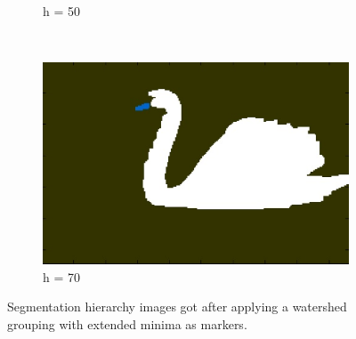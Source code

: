 \documentclass[10pt,twocolumn,letterpaper]{article}
\begin{document}
\begin{figure}
\begin{subfigure}[b]{0.2\textwidth}
        \caption{h = 50}
        \label{fig:h50}
    \end{subfigure}
    ~ 
    \begin{subfigure}[b]{0.2\textwidth}
        \includegraphics[width=\textwidth]{8068Wath70.eps}
        \caption{h = 70}
    \end{subfigure}
   \caption{Segmentation hierarchy images got after applying a watershed grouping  with extended minima as markers.}
   \label{fig:watershed}
\end{figure}
\end{document}
